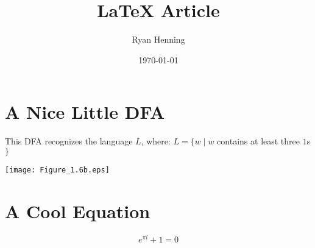 \documentclass{article}
\title{LaTeX Article}
\author{Ryan Henning}
\date{\today}
\begin{document}
\maketitle


\section*{A Nice Little DFA}

This DFA recognizes the language $L$, where:
$L = \{w \mid w$ contains at least three $1$s$\}$
\begin{center}
\texttt{[image: Figure\_1.6b.eps]}
\end{center}


\section*{A Cool Equation}

$$e^{\pi i} + 1 = 0$$
\end{document}
